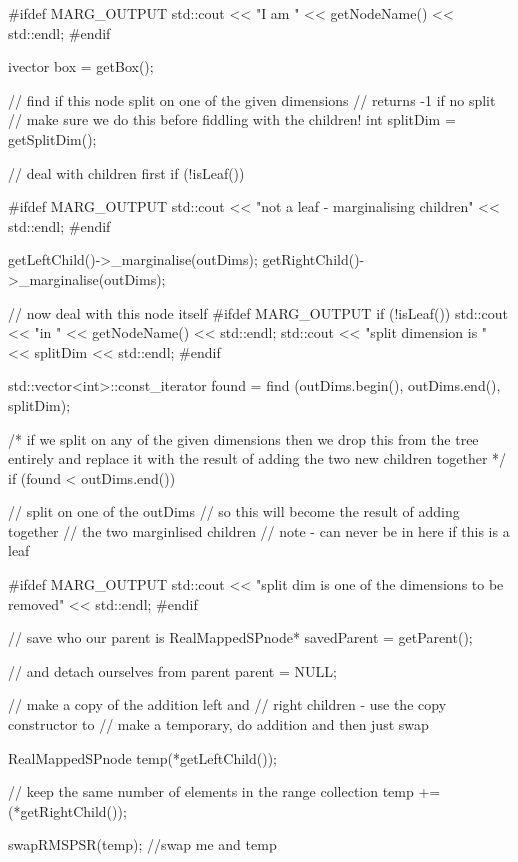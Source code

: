 \begin{DoxyCode}
{
  #ifdef MARG_OUTPUT
    std::cout << "I am " << getNodeName() << std::endl;
  #endif
  
  ivector box = getBox();
  
  // find if this node split on one of the given dimensions
  // returns -1 if no split
  // make sure we do this before fiddling with the children!
  int splitDim = getSplitDim();
  
  // deal with children first
  if (!isLeaf()) {
    
    #ifdef MARG_OUTPUT
      std::cout << "not a leaf - marginalising children\n" << std::endl;
    #endif
  
    getLeftChild()->_marginalise(outDims);    
    getRightChild()->_marginalise(outDims); 
  }               
          
  // now deal with this node itself
  #ifdef MARG_OUTPUT
    if (!isLeaf()) std::cout << "\nback in " << getNodeName() << std::endl;
    std::cout << "\tmy split dimension is " << splitDim << std::endl;
  #endif
  
  std::vector<int>::const_iterator found 
      = find (outDims.begin(), outDims.end(), splitDim);
  
  /* if we split on any of the given dimensions
   then we drop this from the tree entirely and
   replace it with the result
   of adding the two new children together */
  if (found < outDims.end()) { // split on one of the outDims
    // so this will become the result of adding together
    // the two marginlised children
    // note - can never be in here if this is a leaf
    
    #ifdef MARG_OUTPUT
      std::cout << "\tmy split dim is one of the dimensions to be removed" << 
      std::endl;
    #endif
    
    // save who our parent is
    RealMappedSPnode* savedParent = getParent();
    
    // and detach ourselves from parent
    parent = NULL;
    
    // make a copy of the addition left and
    // right children - use the copy constructor to
    // make a temporary, do addition and then just swap 
    
    RealMappedSPnode temp(*getLeftChild());
    
    // keep the same number of elements in the range collection
    temp += (*getRightChild());
    
    swapRMSPSR(temp); //swap me and temp
    
}}
\end{DoxyCode}
